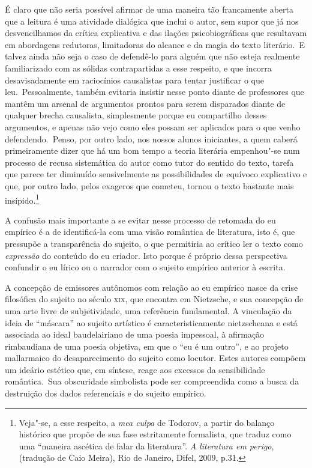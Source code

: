 É claro que não seria possível afirmar de uma maneira tão francamente
aberta que a leitura é uma atividade dialógica que inclui o autor, sem
supor que já nos desvencilhamos da crítica explicativa e das ilações
psicobiográficas que resultavam em abordagens redutoras, limitadoras do
alcance e da magia do texto literário.~E talvez ainda não seja o caso de
defendê-lo para alguém que não esteja realmente familiarizado com as
sólidas contrapartidas a esse respeito, e que incorra desavisadamente em
raciocínios causalistas para tentar justificar o que leu.~Pessoalmente,
também evitaria insistir nesse ponto diante de professores que mantêm um
arsenal de argumentos prontos para serem disparados diante de qualquer
brecha causalista, simplesmente porque eu compartilho desses argumentos,
e apenas não vejo como eles possam ser aplicados para o que venho
defendendo.~Penso, por outro lado, nos nossos alunos iniciantes, a quem
caberá primeiramente dizer que há um bom tempo a teoria literária
empenhou"-se num processo de recusa sistemática do autor como tutor do
sentido do texto, tarefa que parece ter diminuído sensivelmente as
possibilidades de equívoco explicativo e que, por outro lado, pelos
exageros que cometeu, tornou o texto bastante mais insípido.\footnote{Veja"-se,
  a esse respeito, a \emph{mea culpa} de Todorov, a partir do balanço
  histórico que propõe de sua fase estritamente formalista, que traduz
  como uma ``maneira ascética de falar da literatura''. \emph{A
  literatura em perigo}, (tradução de Caio Meira), Rio de Janeiro,
  Difel, 2009, p.31.}

A confusão mais importante a se evitar nesse processo de retomada do eu
empírico é a de identificá-la com uma visão romântica de literatura,
isto é, que pressupõe a transparência do sujeito, o que permitiria ao
crítico ler o texto como \emph{expressão} do conteúdo do eu criador.
Isto porque é próprio dessa perspectiva confundir o eu lírico ou o
narrador com o sujeito empírico anterior à escrita.

A concepção de emissores autônomos com relação ao eu empírico nasce da
crise filosófica do sujeito no século \textsc{xix}, que encontra em
Nietzsche, e sua concepção de uma arte livre de subjetividade, uma
referência fundamental. A vinculação da ideia de ``máscara'' ao sujeito
artístico é caracteristicamente nietzscheana e está associada ao ideal
baudelairiano de uma poesia impessoal, à afirmação rimbaudiana de uma
poesia objetiva, em que o ``eu é um outro'', e ao projeto mallarmaico do
desaparecimento do sujeito como locutor. Estes autores compõem um
ideário estético que, em síntese, reage aos excessos da sensibilidade
romântica.~Sua obscuridade simbolista pode ser compreendida como a busca
da destruição dos dados referenciais e do sujeito empírico.

